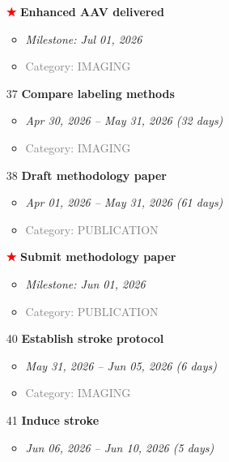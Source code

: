\documentclass[portrait,a4paper]{article}
\begin{document}
\begin{enumerate}[leftmargin=0pt, itemindent=0pt, labelsep=0pt, labelwidth=0pt]
\begin{itemize}
    \end{itemize}
\vspace{0.3cm}
\item[\textcolor{red}{\textbf{★}}] \textbf{Enhanced AAV delivered}
    \begin{itemize}
        \item \textit{Milestone: Jul 01, 2026}
        \item \textcolor{gray}{Category: IMAGING}
    \end{itemize}
\vspace{0.3cm}
\item[37] \textbf{Compare labeling methods}
    \begin{itemize}
        \item \textit{Apr 30, 2026 -- May 31, 2026 (32 days)}
        \item \textcolor{gray}{Category: IMAGING}
    \end{itemize}
\vspace{0.3cm}
\item[38] \textbf{Draft methodology paper}
    \begin{itemize}
        \item \textit{Apr 01, 2026 -- May 31, 2026 (61 days)}
        \item \textcolor{gray}{Category: PUBLICATION}
    \end{itemize}
\vspace{0.3cm}
\item[\textcolor{red}{\textbf{★}}] \textbf{Submit methodology paper}
    \begin{itemize}
        \item \textit{Milestone: Jun 01, 2026}
        \item \textcolor{gray}{Category: PUBLICATION}
    \end{itemize}
\vspace{0.3cm}
\item[40] \textbf{Establish stroke protocol}
    \begin{itemize}
        \item \textit{May 31, 2026 -- Jun 05, 2026 (6 days)}
        \item \textcolor{gray}{Category: IMAGING}
    \end{itemize}
\vspace{0.3cm}
\item[41] \textbf{Induce stroke}
    \begin{itemize}
        \item \textit{Jun 06, 2026 -- Jun 10, 2026 (5 days)}

\end{itemize}
\end{enumerate}
\end{document}
